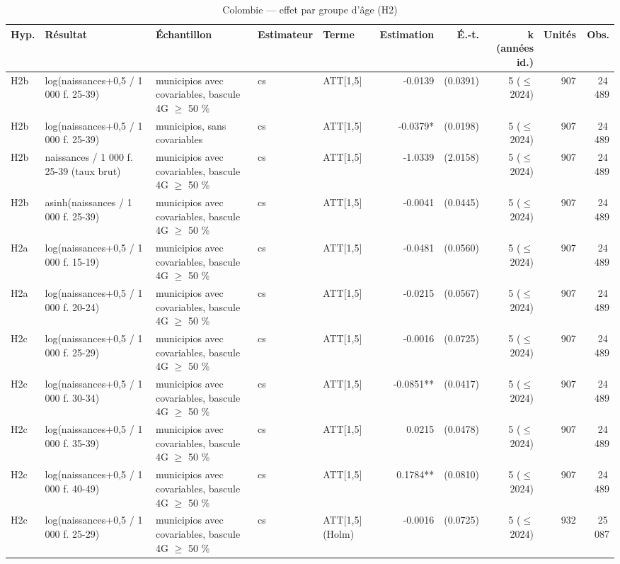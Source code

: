 \begin{table}\centering
\begin{threeparttable}
\caption{Colombie — effet par groupe d'âge (H2)}\label{tab:co_h2age}
\scriptsize
\begin{tabular}{lp{4.7cm}p{5.1cm}lp{4.2cm}rrrrr}
\toprule
Hyp. & Résultat & Échantillon & Estimateur & Terme & Estimation & É.-t. & k (années id.) & Unités & Obs. \\
\midrule
H2b & log(naissances+0,5 / 1 000 f. 25-39) & municipios avec covariables, bascule 4G $\geq$ 50 \% & cs & ATT[1,5] & -0.0139 & (0.0391) & 5 ($\leq$ 2024) & 907 & 24\,489 \\
H2b & log(naissances+0,5 / 1 000 f. 25-39) & municipios, sans covariables & cs & ATT[1,5] & -0.0379* & (0.0198) & 5 ($\leq$ 2024) & 907 & 24\,489 \\
H2b & naissances / 1 000 f. 25-39 (taux brut) & municipios avec covariables, bascule 4G $\geq$ 50 \% & cs & ATT[1,5] & -1.0339 & (2.0158) & 5 ($\leq$ 2024) & 907 & 24\,489 \\
H2b & asinh(naissances / 1 000 f. 25-39) & municipios avec covariables, bascule 4G $\geq$ 50 \% & cs & ATT[1,5] & -0.0041 & (0.0445) & 5 ($\leq$ 2024) & 907 & 24\,489 \\
H2a & log(naissances+0,5 / 1 000 f. 15-19) & municipios avec covariables, bascule 4G $\geq$ 50 \% & cs & ATT[1,5] & -0.0481 & (0.0560) & 5 ($\leq$ 2024) & 907 & 24\,489 \\
H2a & log(naissances+0,5 / 1 000 f. 20-24) & municipios avec covariables, bascule 4G $\geq$ 50 \% & cs & ATT[1,5] & -0.0215 & (0.0567) & 5 ($\leq$ 2024) & 907 & 24\,489 \\
H2c & log(naissances+0,5 / 1 000 f. 25-29) & municipios avec covariables, bascule 4G $\geq$ 50 \% & cs & ATT[1,5] & -0.0016 & (0.0725) & 5 ($\leq$ 2024) & 907 & 24\,489 \\
H2c & log(naissances+0,5 / 1 000 f. 30-34) & municipios avec covariables, bascule 4G $\geq$ 50 \% & cs & ATT[1,5] & -0.0851** & (0.0417) & 5 ($\leq$ 2024) & 907 & 24\,489 \\
H2c & log(naissances+0,5 / 1 000 f. 35-39) & municipios avec covariables, bascule 4G $\geq$ 50 \% & cs & ATT[1,5] & 0.0215 & (0.0478) & 5 ($\leq$ 2024) & 907 & 24\,489 \\
H2c & log(naissances+0,5 / 1 000 f. 40-49) & municipios avec covariables, bascule 4G $\geq$ 50 \% & cs & ATT[1,5] & 0.1784** & (0.0810) & 5 ($\leq$ 2024) & 907 & 24\,489 \\
H2c & log(naissances+0,5 / 1 000 f. 25-29) & municipios avec covariables, bascule 4G $\geq$ 50 \% & cs & ATT[1,5] (Holm) & -0.0016 & (0.0725) & 5 ($\leq$ 2024) & 932 & 25\,087 \\

\end{tabular}
\end{threeparttable}
\end{table}
